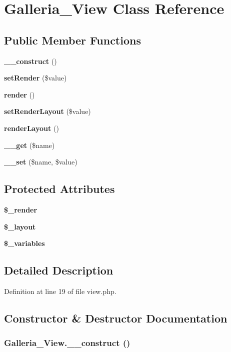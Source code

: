 \section{Galleria\_\-View Class Reference}
\label{classGalleria__View}
\subsection*{Public Member Functions}
\begin{CompactItemize}
\item 
{\bf \_\-\_\-construct} ()
\item 
{\bf setRender} (\$value)
\item 
{\bf render} ()
\item 
{\bf setRenderLayout} (\$value)
\item 
{\bf renderLayout} ()
\item 
{\bf \_\-\_\-get} (\$name)
\item 
{\bf \_\-\_\-set} (\$name, \$value)
\end{CompactItemize}
\subsection*{Protected Attributes}
\begin{CompactItemize}
\item 
{\bf \$\_\-render}
\item 
{\bf \$\_\-layout}
\item 
{\bf \$\_\-variables}
\end{CompactItemize}


\subsection{Detailed Description}


Definition at line 19 of file view.php.

\subsection{Constructor \& Destructor Documentation}
\subsubsection{\setlength{\rightskip}{0pt plus 5cm}Galleria\_\-View.\_\-\_\-construct ()}\label{classGalleria__View_a46d7683cc6b80627d8d5e1b006a53cd}


